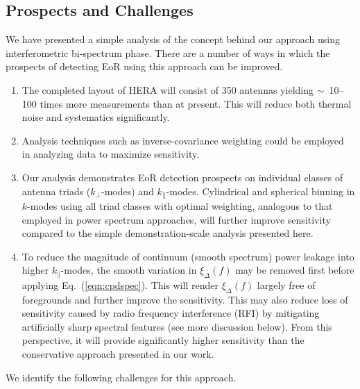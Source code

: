 \documentclass[
reprint,
superscriptaddress,
amsmath,
amssymb,
aps,
prd
]{revtex4-1}
\begin{document}
\subsection{Prospects and Challenges}\label{sec:prospects-challenges}

We have presented a simple analysis of the concept behind our approach using interferometric bi-spectrum phase. There are a number of ways in which the prospects of detecting EoR using this approach can be improved.

\begin{enumerate}
\item The completed layout of HERA will consist of 350 antennas yielding $\sim$~10--100 times more measurements than at present. This will reduce both thermal noise and systematics significantly. 
\item Analysis techniques such as inverse-covariance weighting \cite{liu14a,liu14b,dil15} could be employed in analyzing data to maximize sensitivity.
\item Our analysis demonstrates EoR detection prospects on individual classes of antenna triads ($k_\perp$-modes) and $k_\parallel$-modes. Cylindrical and spherical binning in $k$-modes using all triad classes with optimal weighting, analogous to that employed in power spectrum approaches, will further improve sensitivity compared to the simple demonstration-scale analysis presented here.
\item To reduce the magnitude of continuum (smooth spectrum) power leakage into higher $k_\parallel$-modes, the smooth variation in $\xi_\Delta(f)$ may be removed first before applying Eq.~(\ref{eqn:cpdspec}). This will render $\xi_\Delta(f)$ largely free of foregrounds and further improve the sensitivity. This may also reduce loss of sensitivity caused by radio frequency interference (RFI) by mitigating artificially sharp spectral features (see more discussion below). From this perspective, it will provide significantly higher sensitivity than the conservative approach presented in our work.
\end{enumerate}

We identify the following challenges for this approach.
\end{document}
